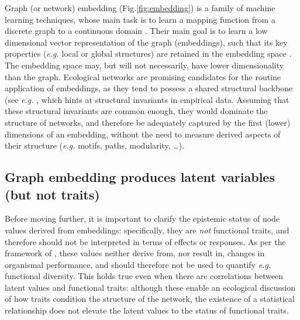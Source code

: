 Graph (or network) embedding (Fig.\ref{fig:embedding}) is a family of machine
learning techniques, whose main task is to learn a mapping function from
a discrete graph to a continuous domain \cite{Arsov2019Network,
Chami2022Machine}. Their main goal is to learn a low dimensional
vector representation of the graph (embeddings), such that its key
properties (\emph{e.g.} local or global structures) are retained in the
embedding space \cite{Yan2005Graph}. The embedding space may, but will
not necessarily, have lower dimensionality than the graph. Ecological
networks are promising candidates for the routine application of
embeddings, as they tend to possess a shared structural backbone (see
\emph{e.g.} \cite{BramonMora2018Identifying}, which hints at structural
invariants in empirical data. Assuming that these structural invariants
are common enough, they would dominate the structure of networks, and
therefore be adequately captured by the first (lower) dimensions of an
embedding, without the need to measure derived aspects of their
structure (\emph{e.g.} motifs, paths, modularity, \ldots).

\subsection{Graph embedding produces latent variables (but not
traits)}\label{graph-embedding-produces-latent-variables-but-not-traits}

Before moving further, it is important to clarify the epistemic status
of node values derived from embeddings: specifically, they are
\emph{not} functional traits, and therefore should not be interpreted in
terms of effects or responses. As per the framework of
\cite{Malaterre2019Functional}, these values neither derive from, nor result
in, changes in organismal performance, and should therefore not be used
to quantify \emph{e.g.} functional diversity. This holds true even when
there are correlations between latent values and functional traits:
although these enable an ecological discussion of how traits condition
the structure of the network, the existence of a statistical
relationship does not elevate the latent values to the status of
functional traits.

